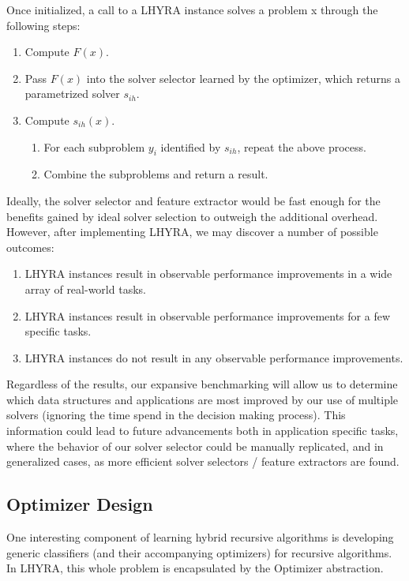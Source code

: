\documentclass{article}
\begin{document}
Once initialized, a call to a LHYRA instance solves a problem x through the following steps:

\begin{enumerate}
	\item Compute $F(x)$.
	\item Pass $F(x)$ into the solver selector learned by the optimizer, which returns a parametrized solver $s_{ih}$.
	\item Compute $s_{ih}(x)$.
	\begin{enumerate}
		\item For each subproblem $y_i$ identified by $s_{ih}$, repeat the above process.
		\item Combine the subproblems and return a result.
	\end{enumerate}
\end{enumerate}

Ideally, the solver selector and feature extractor would be fast enough for the benefits gained by ideal solver selection to outweigh the additional overhead. However, after implementing LHYRA, we may discover a number of possible outcomes:

\begin{enumerate}
	\item LHYRA instances result in observable performance improvements in a wide array of real-world tasks.
	\item LHYRA instances result in observable performance improvements for a few specific tasks.
	\item LHYRA instances do not result in any observable performance improvements.
\end{enumerate}

Regardless of the results, our expansive benchmarking will allow us to determine which data structures and applications are most improved by our use of multiple solvers (ignoring the time spend in the decision making process). This information could lead to future advancements both in application specific tasks, where the behavior of our solver selector could be manually replicated, and in generalized cases, as more efficient solver selectors / feature extractors are found.

\subsection*{Optimizer Design}

One interesting component of learning hybrid recursive algorithms is developing generic classifiers (and their accompanying optimizers) for recursive algorithms.  In LHYRA, this whole problem is encapsulated by the Optimizer abstraction.
\end{document}

